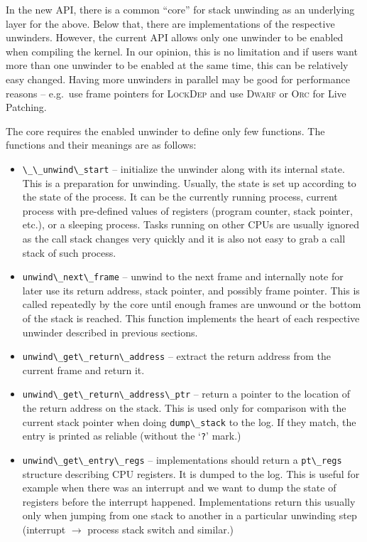 \documentclass[10pt]{llncs}
\newcommand{\code}[2][]{\lstinline[columns=fullflexible, #1]$#2$}
\newcommand{\dwarf}{\textsc{Dwarf}\xspace}
\newcommand{\orc}{\textsc{Orc}\xspace}
\begin{document}
In the new API, there is a common ``core'' for stack unwinding as an
underlying layer for the above.  Below that, there are implementations of the
respective unwinders. However, the current API allows only one unwinder to be
enabled when compiling the kernel. In our opinion, this is no limitation and
if users want more than one unwinder to be enabled at the same time, this can
be relatively easy changed. Having more unwinders in parallel may be good for
performance reasons -- e.g.\ use frame pointers for \textsc{LockDep} and use
\dwarf or \orc for Live Patching.

The core requires the enabled unwinder to define only few functions. The
functions and their meanings are as follows:
\begin{itemize}
  \item \code{\_\_unwind\_start} -- initialize the unwinder along with its
    internal state. This is a preparation for unwinding. Usually, the state is
    set up according to the state of the process. It can be the currently
    running process, current process with pre-defined values of registers
    (program counter, stack pointer, etc.), or a sleeping process. Tasks
    running on other CPUs are usually ignored as the call stack changes very
    quickly and it is also not easy to grab a call stack of such process.
  \item \code{unwind\_next\_frame} -- unwind to the next frame and internally
    note for later use its return address, stack pointer, and possibly frame
    pointer. This is called repeatedly by the core until enough frames are
    unwound or the bottom of the stack is reached. This function implements
    the heart of each respective unwinder described in previous sections.
  \item \code{unwind\_get\_return\_address} -- extract the return address from
    the current frame and return it.
  \item \code{unwind\_get\_return\_address\_ptr} -- return a pointer to the
    location of the return address on the stack. This is used only for
    comparison with the current stack pointer when doing \code{dump\_stack} to
    the log. If they match, the entry is printed as reliable (without the
    `\code{?}' mark.)
  \item \code{unwind\_get\_entry\_regs} -- implementations should return a
    \code{pt\_regs} structure describing CPU registers. It is dumped to the
    log.  This is useful for example when there was an interrupt and we want
    to dump the state of registers before the interrupt happened.
    Implementations return this usually only when jumping from one stack to
    another in a particular unwinding step (interrupt $\rightarrow$ process
    stack switch and similar.)
\end{itemize}
\end{document}
